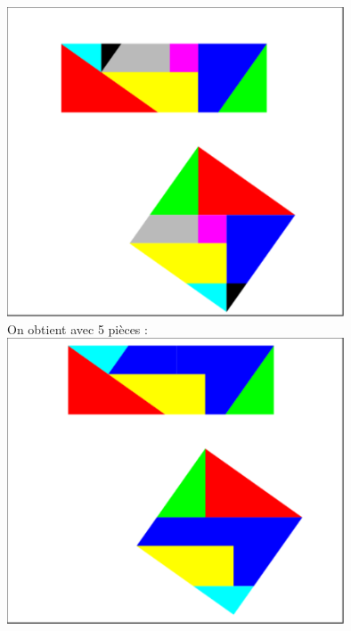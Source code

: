 \documentclass[a4paper,11pt]{book}
\begin{document}
\includegraphics[width=10cm]{carresqrt30}\\
On obtient avec 5 pi\`eces :\\
\includegraphics[width=10cm]{carresqrt35}
\end{document}
